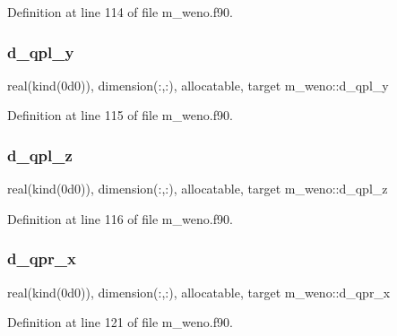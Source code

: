 Definition at line 114 of file m\+\_\+weno.\+f90.

\mbox{\label{namespacem__weno_a041d103130713b7b3e8669c46b6d7ab0}} 
\subsubsection{\texorpdfstring{d\+\_\+qpl\+\_\+y}{d\_qpl\_y}}
{\footnotesize\ttfamily real(kind(0d0)), dimension(\+:,\+:), allocatable, target m\+\_\+weno\+::d\+\_\+qpl\+\_\+y}



Definition at line 115 of file m\+\_\+weno.\+f90.

\mbox{\label{namespacem__weno_a058a869c6fa80036a080e4a2b28bfd19}} 
\subsubsection{\texorpdfstring{d\+\_\+qpl\+\_\+z}{d\_qpl\_z}}
{\footnotesize\ttfamily real(kind(0d0)), dimension(\+:,\+:), allocatable, target m\+\_\+weno\+::d\+\_\+qpl\+\_\+z}



Definition at line 116 of file m\+\_\+weno.\+f90.

\mbox{\label{namespacem__weno_af7a633ce21fa6828a11c4594abccbd61}} 
\subsubsection{\texorpdfstring{d\+\_\+qpr\+\_\+x}{d\_qpr\_x}}
{\footnotesize\ttfamily real(kind(0d0)), dimension(\+:,\+:), allocatable, target m\+\_\+weno\+::d\+\_\+qpr\+\_\+x}



Definition at line 121 of file m\+\_\+weno.\+f90.

\mbox{\label{namespacem__weno_a705ea5ec335fcf839b93e6e42204b850}} 
